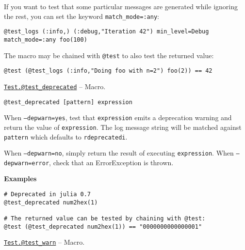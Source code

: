 \begin{adjustwidth}{2em}{0pt}
If you want to test that some particular messages are generated while ignoring the rest, you can set the keyword \texttt{match\_mode=:any}:


\begin{lstlisting}
@test_logs (:info,) (:debug,"Iteration 42") min_level=Debug match_mode=:any foo(100)
\end{lstlisting}

The macro may be chained with \texttt{@test} to also test the returned value:


\begin{lstlisting}
@test (@test_logs (:info,"Doing foo with n=2") foo(2)) == 42
\end{lstlisting}



\end{adjustwidth}
\hypertarget{3450176127005416215}{}
\hyperlink{3450176127005416215}{\texttt{Test.@test\_deprecated}}  -- {Macro.}

\begin{adjustwidth}{2em}{0pt}


\begin{verbatim}
@test_deprecated [pattern] expression
\end{verbatim}

When \texttt{--depwarn=yes}, test that \texttt{expression} emits a deprecation warning and return the value of \texttt{expression}.  The log message string will be matched against \texttt{pattern} which defaults to \texttt{r{\textquotedbl}deprecated{\textquotedbl}i}.

When \texttt{--depwarn=no}, simply return the result of executing \texttt{expression}.  When \texttt{--depwarn=error}, check that an ErrorException is thrown.

\textbf{Examples}


\begin{lstlisting}
# Deprecated in julia 0.7
@test_deprecated num2hex(1)

# The returned value can be tested by chaining with @test:
@test (@test_deprecated num2hex(1)) == "0000000000000001"
\end{lstlisting}



\end{adjustwidth}
\hypertarget{12478857733960407392}{}
\hyperlink{12478857733960407392}{\texttt{Test.@test\_warn}}  -- {Macro.}

